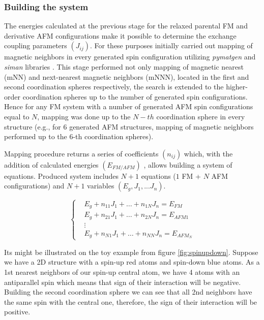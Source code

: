 \subsubsection{Building the system}
The energies calculated at the previous stage for the relaxed parental FM and derivative AFM configurations make it possible to determine the exchange coupling parameters $(J_{ij})$. For these purposes initially carried out mapping of magnetic neighbors in every generated spin configuration utilizing \textit{pymatgen} \cite{Ong:2013vd} and \textit{siman} \cite{Aksyonov_2018} libraries . This stage performed not only mapping of magnetic nearest (mNN) and next-nearest magnetic neighbors (mNNN), located in the first and second coordination spheres respectively, the search is extended to the higher-order coordination spheres up to the number of generated spin configurations.
Hence for any FM system with a number of generated AFM spin configurations equal to $N$, mapping was done up to the $N-th$ coordination sphere in every structure (e.g., for 6 generated AFM structures, mapping of magnetic neighbors performed up to the 6-th coordination spheres).

Mapping procedure returns a series of coefficients $(n_{ij})$ which, with the addition of calculated energies $(E_{FM/AFM})$ , allows building a system of equations. Produced system includes $N + 1$ equations ($1$ FM + $N$ AFM configurations) and $N + 1$ variables $(E_g, J_1, ... J_n)$. 

\begin{equation}
  \left\{
    \begin{aligned}
      & E_g + n_{11}J_1 + \hdots + n_{1N} J_n = E_{FM}\\
      & E_g + n_{21}J_1 + \hdots + n_{2N} J_n = E_{AFM1}\\
      &\vdots\\
      & E_g + n_{N1} J_1 + \hdots + n_{NN}J_n = E_{AFM_N}
    \end{aligned}
  \right.
\end{equation}


Its might be illustrated on the toy example from figure \ref{fig:spinupdown}. Suppose we have a 2D structure with a spin-up red atoms and spin-down blue atoms.  As a 1st nearest neighbors of our spin-up central atom, we have 4 atoms with an antiparallel spin which means that sign of their interaction will be negative. Building the second coordination sphere we can see that all 2nd neighbors have the same spin with the central one, therefore, the sign of their interaction will be positive. 

